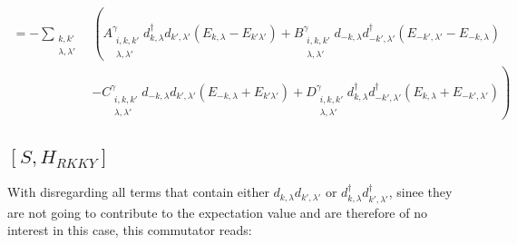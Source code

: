 \begin{align}
    = - \sum_{\substack{k,k'\\ \lambda, \lambda' }} 
    & \left( A_{\substack{i,k,k'\\ \lambda, \lambda'}}^{ \gamma} d^{\dag}_{k,\lambda} d_{k', \lambda'} (E_{k,\lambda} - E_{k'\lambda'}) 
    + B_{\substack{i,k,k'\\ \lambda, \lambda'}}^{ \gamma} d_{-k,\lambda} d^{\dag}_{-k', \lambda'} ( E_{-k',\lambda'} - E_{-k,\lambda} ) \right. \\
    &\left. - C_{\substack{i,k,k'\\ \lambda, \lambda'}}^{ \gamma} d_{-k,\lambda} d_{k', \lambda'}(E_{-k, \lambda} + E_{k'\lambda'})
    + D_{\substack{i,k,k'\\ \lambda, \lambda'}}^{ \gamma} d^{\dag}_{k,\lambda} d^{\dag}_{-k', \lambda'} (E_{k,\lambda} + E_{-k', \lambda'}) \right)
\end{align}

\subsection{$[S,H_{RKKY}]$} \label{app:commutator2}
With disregarding all terms that contain either $d_{k,\lambda} d_{k', \lambda'}$ or $d^{\dag}_{k,\lambda} d^{\dag}_{k', \lambda'}$, sinee they are not going to contribute to the expectation value and are therefore of no interest in this case, this commutator reads:


